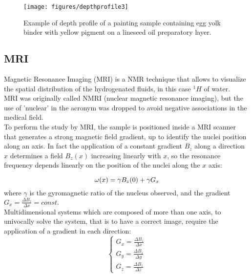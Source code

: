 \documentclass[a4paper,11pt]{report}
\begin{document}
\begin{figure}[h]
	\centering
	\texttt{[image: figures/depthprofile3]}
	\caption{Example of depth profile of a painting sample containing egg yolk binder with yellow pigment on a lineseed oil preparatory layer\cite{marmotti}.}\label{esempiodepth}
\end{figure}

 
\subsection{MRI}
Magnetic Resonance Imaging (MRI) is a NMR technique that allows to visualize the spatial distribution of the hydrogenated fluids, in this case $^1H$ of water.\\ MRI was originally called NMRI (nuclear magnetic resonance imaging), but the use of 'nuclear' in the acronym was dropped to avoid negative associations in the medical field.\\
To perform the study by MRI, the sample is positioned inside a MRI scanner that generates a strong magnetic field gradient, up to identify the nuclei position along an axis. In fact the application of a constant gradient $B_z$ along a direction $x$ determines a field $B_z(x)$ increasing linearly with $x$, so the resonance frequency depends linearly on the position of the nuclei along the $x$ axis:

\begin{equation} \label{frequenzaMRI}
	\large{\omega(x)= \gamma B_z(0)+ \gamma G_x}
\end{equation}
where $\gamma$ is the gyromagnetic ratio of the nucleus observed, and the gradient $G_x= \frac{\Delta B_z}{\Delta x} = const.$\\
Multidimensional systems which are composed of more than one axis, to univocally solve the system, that is to have a correct image, require the application of a gradient in each direction:\\
\large{\[
\begin{cases}
G_x= \frac{\Delta B_z}{\Delta x} \\
G_y= \frac{\Delta B_z}{\Delta y} \\
G_z= \frac{\Delta B_z}{\Delta z}
\end{cases}
\]}
\\
\end{document}
